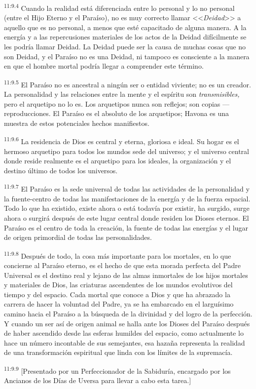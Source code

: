 \par
\textsuperscript{11:9.4} Cuando la realidad está diferenciada entre lo personal y lo no personal (entre el Hijo Eterno y el Paraíso), no es muy correcto llamar <<\textit{Deidad}>> a aquello que es no personal, a menos que esté capacitado de alguna manera. A la energía y a las repercusiones materiales de los actos de la Deidad difícilmente se les podría llamar Deidad. La Deidad puede ser la causa de muchas cosas que no son Deidad, y el Paraíso no es una Deidad, ni tampoco es consciente a la manera en que el hombre mortal podría llegar a comprender este término.

\par
\textsuperscript{11:9.5} El Paraíso no es ancestral a ningún ser o entidad viviente; no es un creador. La personalidad y las relaciones entre la mente y el espíritu son \textit{transmisibles,} pero el arquetipo no lo es. Los arquetipos nunca son reflejos; son copias ---reproducciones. El Paraíso es el absoluto de los arquetipos; Havona es una muestra de estos potenciales hechos manifiestos.

\par
\textsuperscript{11:9.6} La residencia de Dios es central y eterna, gloriosa e ideal. Su hogar es el hermoso arquetipo para todos los mundos sede del universo; y el universo central donde reside realmente es el arquetipo para los ideales, la organización y el destino último de todos los universos.

\par
\textsuperscript{11:9.7} El Paraíso es la sede universal de todas las actividades de la personalidad y la fuente-centro de todas las manifestaciones de la energía y de la fuerza espacial. Todo lo que ha existido, existe ahora o está todavía por existir, ha surgido, surge ahora o surgirá después de este lugar central donde residen los Dioses eternos. El Paraíso es el centro de toda la creación, la fuente de todas las energías y el lugar de origen primordial de todas las personalidades.

\par
\textsuperscript{11:9.8} Después de todo, la cosa más importante para los mortales, en lo que concierne al Paraíso eterno, es el hecho de que esta morada perfecta del Padre Universal es el destino real y lejano de las almas inmortales de los hijos mortales y materiales de Dios, las criaturas ascendentes de los mundos evolutivos del tiempo y del espacio. Cada mortal que conoce a Dios y que ha abrazado la carrera de hacer la voluntad del Padre, ya se ha embarcado en el larguísimo camino hacia el Paraíso a la búsqueda de la divinidad y del logro de la perfección. Y cuando un ser así de origen animal se halla ante los Dioses del Paraíso después de haber ascendido desde las esferas humildes del espacio, como actualmente lo hace un número incontable de sus semejantes, esa hazaña representa la realidad de una transformación espiritual que linda con los límites de la supremacía.

\par
\textsuperscript{11:9.9} [Presentado por un Perfeccionador de la Sabiduría, encargado por los Ancianos de los Días de Uversa para llevar a cabo esta tarea.]